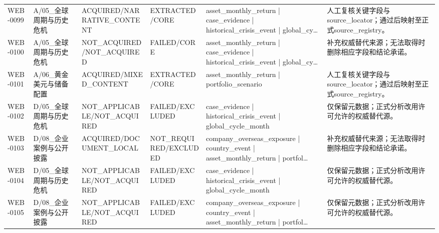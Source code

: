 \begin{landscape}
\begin{longtable}{p{1.8cm}p{2.6cm}p{2.6cm}p{2.6cm}p{4.8cm}p{7.2cm}}
WEB-0099 & A/\allowbreak{}05\_\allowbreak{}全球周期与历史危机 & ACQUIRED/\allowbreak{}NARRATIVE\_\allowbreak{}CONTENT & EXTRACTED/\allowbreak{}CORE & asset\_\allowbreak{}monthly\_\allowbreak{}return | case\_\allowbreak{}evidence | historical\_\allowbreak{}crisis\_\allowbreak{}event | global\_\allowbreak{}cy… & 人工复核关键字段与source\_\allowbreak{}locator；通过后映射至正式source\_\allowbreak{}registry。\\
WEB-0100 & A/\allowbreak{}05\_\allowbreak{}全球周期与历史危机 & NOT\_\allowbreak{}ACQUIRED/\allowbreak{}NOT\_\allowbreak{}ACQUIRED & FAILED/\allowbreak{}CORE & asset\_\allowbreak{}monthly\_\allowbreak{}return | case\_\allowbreak{}evidence | historical\_\allowbreak{}crisis\_\allowbreak{}event | global\_\allowbreak{}cy… & 补充权威替代来源；无法取得时删除相应字段和结论承诺。\\
WEB-0101 & A/\allowbreak{}06\_\allowbreak{}黄金美元与储备配置 & ACQUIRED/\allowbreak{}MIXED\_\allowbreak{}CONTENT & EXTRACTED/\allowbreak{}CORE & asset\_\allowbreak{}monthly\_\allowbreak{}return | portfolio\_\allowbreak{}scenario & 人工复核关键字段与source\_\allowbreak{}locator；通过后映射至正式source\_\allowbreak{}registry。\\
WEB-0102 & D/\allowbreak{}05\_\allowbreak{}全球周期与历史危机 & NOT\_\allowbreak{}APPLICABLE/\allowbreak{}NOT\_\allowbreak{}ACQUIRED & FAILED/\allowbreak{}EXCLUDED & case\_\allowbreak{}evidence | historical\_\allowbreak{}crisis\_\allowbreak{}event | global\_\allowbreak{}cycle\_\allowbreak{}month & 仅保留元数据；正式分析改用许可允许的权威替代源。\\
WEB-0103 & D/\allowbreak{}08\_\allowbreak{}企业案例与公开披露 & ACQUIRED/\allowbreak{}DOCUMENT\_\allowbreak{}LOCAL & NOT\_\allowbreak{}REQUIRED/\allowbreak{}EXCLUDED & company\_\allowbreak{}overseas\_\allowbreak{}exposure | country\_\allowbreak{}event | asset\_\allowbreak{}monthly\_\allowbreak{}return | portfol… & 补充权威替代来源；无法取得时删除相应字段和结论承诺。\\
WEB-0104 & D/\allowbreak{}05\_\allowbreak{}全球周期与历史危机 & NOT\_\allowbreak{}APPLICABLE/\allowbreak{}NOT\_\allowbreak{}ACQUIRED & FAILED/\allowbreak{}EXCLUDED & case\_\allowbreak{}evidence | historical\_\allowbreak{}crisis\_\allowbreak{}event | global\_\allowbreak{}cycle\_\allowbreak{}month & 仅保留元数据；正式分析改用许可允许的权威替代源。\\
WEB-0105 & D/\allowbreak{}08\_\allowbreak{}企业案例与公开披露 & NOT\_\allowbreak{}APPLICABLE/\allowbreak{}NOT\_\allowbreak{}ACQUIRED & FAILED/\allowbreak{}EXCLUDED & company\_\allowbreak{}overseas\_\allowbreak{}exposure | country\_\allowbreak{}event | asset\_\allowbreak{}monthly\_\allowbreak{}return | portfol… & 仅保留元数据；正式分析改用许可允许的权威替代源。\\

\end{longtable}
\end{landscape}
